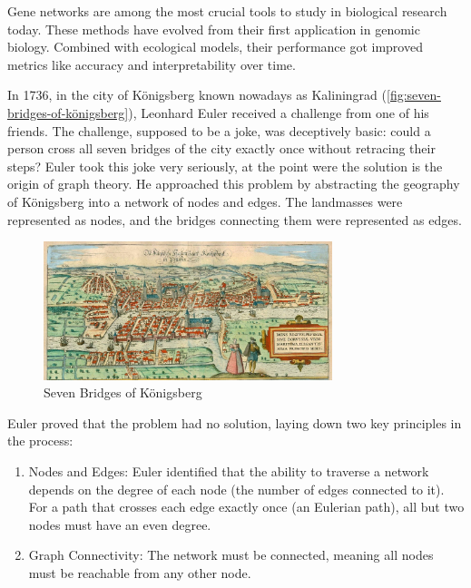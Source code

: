 Gene networks are among the most crucial tools to study in biological research today.
These methods have evolved from their first application in genomic biology.
Combined with ecological models, their performance got improved metrics like accuracy and interpretability over time.

In 1736, in the city of Königsberg known nowadays as Kaliningrad (\autoref{fig:seven-bridges-of-königsberg}), Leonhard Euler received a challenge from one of his friends.
The challenge, supposed to be a joke, was deceptively basic: could a person cross all seven bridges of the city exactly once without retracing their steps?
Euler took this joke very seriously, at the point were the solution is the origin of graph theory.
He approached this problem by abstracting the geography of Königsberg into a network of nodes and edges.
The landmasses were represented as nodes, and the bridges connecting them were represented as edges.
\begin{figure}[h!]
    \centering
    \includegraphics[width=0.75\textwidth]{konigsberg-1581-22} %
    \caption{Seven Bridges of Königsberg\cite{young_seven_2020}}
    \label{fig:seven-bridges-of-königsberg}
\end{figure}

\noindent Euler proved that the problem had no solution, laying down two key principles in the process:
\begin{enumerate}
    \item Nodes and Edges: Euler identified that the ability to traverse a network depends on the degree of each node (the number of edges connected to it).
    For a path that crosses each edge exactly once (an Eulerian path), all but two nodes must have an even degree.
    \item Graph Connectivity: The network must be connected, meaning all nodes must be reachable from any other node.
\end{enumerate}

